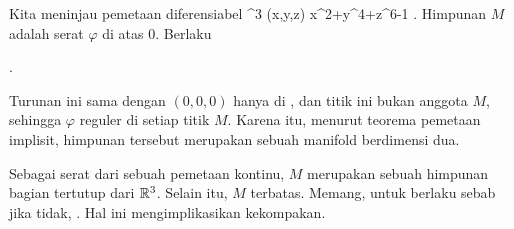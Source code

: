 Kita meninjau pemetaan diferensiabel
\maabbeledisp {\varphi} {\R^3} {\R
} {(x,y,z)} { x^2+y^4+z^6-1
} {.}
Himpunan $M$ adalah serat $\varphi$ di atas $0$. Berlaku

 { . }

Turunan ini sama dengan $(0,0,0)$ hanya di
, dan titik ini bukan anggota $M$, sehingga $\varphi$ reguler di setiap titik $M$. Karena itu, menurut teorema pemetaan implisit, himpunan tersebut merupakan sebuah manifold berdimensi dua.

Sebagai serat dari sebuah pemetaan kontinu, $M$ merupakan sebuah himpunan bagian tertutup dari ${\mathbb R}^3$. Selain itu, $M$ terbatas. Memang, untuk
 berlaku
 sebab jika tidak,
. Hal ini mengimplikasikan kekompakan.
